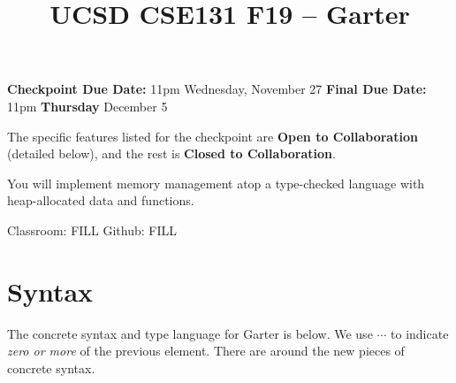 \documentclass[10pt, oneside]{article}
\title{UCSD CSE131 F19 -- Garter}
\begin{document}
\maketitle 

{\bf Checkpoint Due Date:} 11pm Wednesday, November 27 \hspace{2em} {\bf Final Due Date:} 11pm {\bf Thursday} December 5

The specific features listed for the checkpoint are {\bf Open to
Collaboration} (detailed below), and the rest is {\bf Closed to
Collaboration}.

You will implement memory management atop a type-checked language with
heap-allocated data and functions.

Classroom: FILL \hspace{1em} Github: FILL

\section*{Syntax}

The concrete syntax and type language for Garter is below. We use $\cdots$ to
indicate \textit{zero or more} of the previous element. There are
 around the new pieces of concrete syntax.
\end{document}
